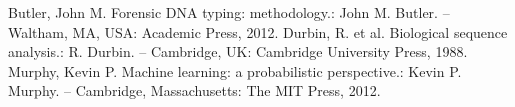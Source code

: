\documentclass[a4paper,12pt]{article}
\begin{document}
	
	\tableofcontents \newpage

	
	\newpage
	\begin{thebibliography}{99}
		 Butler, John M. Forensic DNA typing: methodology.: John M. Butler. -- Waltham, MA, USA: Academic Press, 2012.
         Durbin, R. et al. Biological sequence analysis.: R. Durbin. -- Cambridge, UK: Cambridge University Press, 1988.
		 Murphy, Kevin P. Machine learning: a probabilistic perspective.: Kevin P. Murphy. -- Cambridge, Massachusetts: The MIT Press, 2012.
	\end{thebibliography}

	\newpage
	
\end{document}
